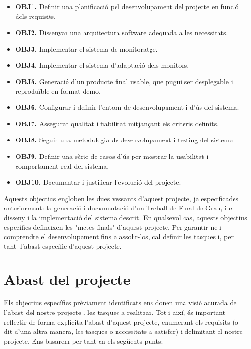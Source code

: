 \begin{itemize}
\item \textbf{OBJ1.} Definir una planificació pel desenvolupament del projecte en funció dels requisits.
\item \textbf{OBJ2.} Dissenyar una arquitectura software adequada a les necessitats.
\item \textbf{OBJ3.} Implementar el sistema de monitoratge.
\item \textbf{OBJ4.} Implementar el sistema d'adaptació dels monitors.
\item \textbf{OBJ5.} Generació d’un producte final usable, que pugui ser desplegable i reproduïble en format demo.
\item \textbf{OBJ6.} Configurar i definir l’entorn de desenvolupament i d’ús del sistema.
\item \textbf{OBJ7.} Assegurar qualitat i fiabilitat mitjançant els criteris definits.
\item \textbf{OBJ8.} Seguir una metodologia de desenvolupament i testing del sistema.
\item \textbf{OBJ9.} Definir una sèrie de casos d’ús per mostrar la usabilitat i comportament real del sistema.
\item \textbf{OBJ10.} Documentar i justificar l’evolució del projecte.
\end{itemize}

Aquests objectius engloben les dues vessants d'aquest projecte, ja especificades anteriorment: la generació i documentació d'un Treball de Final de Grau, i el disseny i la implementació del sistema descrit. En qualsevol cas, aquests objectius específics defineixen les "metes finals" d'aquest projecte. Per garantir-ne i comprendre el desenvolupament fins a assolir-los, cal definir les tasques i, per tant, l'abast específic d'aquest projecte.


\section{Abast del projecte}

Els objectius específics prèviament identificats ens donen una visió acurada de l’abast del nostre projecte i les tasques a realitzar. Tot i així, és important reflectir de forma explícita l’abast d’aquest projecte, enumerant els requisits (o dit d’una altra manera, les tasques o necessitats a satisfer) i delimitant el nostre projecte. Ens basarem per tant en els següents punts:

